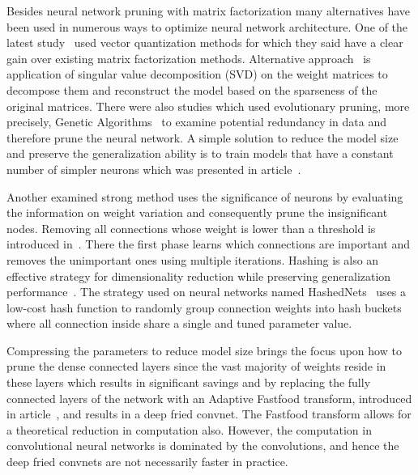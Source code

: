 \documentclass{article} %
\begin{document}
Besides neural network pruning with matrix factorization many alternatives have
been used in numerous ways to optimize neural network architecture. One of the
latest study~\cite{DBLP:journals/corr/GongLYB14} used vector quantization
methods for which they said have a clear gain over existing matrix
factorization methods. Alternative approach~\cite{xue2013restructuring} is
application of singular value decomposition (SVD) on the weight matrices to
decompose them and reconstruct the model based on the sparseness of the
original matrices. There were also studies which used evolutionary pruning,
more precisely, Genetic Algorithms~\cite{li2012tuning} to examine potential
redundancy in data and therefore prune the neural network. A simple solution to
reduce the model size and preserve the generalization ability is to train
models that have a constant number of simpler neurons which was presented in
article~\cite{collins2014memory}.

Another examined strong method uses the significance of neurons by evaluating
the information on weight variation and consequently prune the insignificant
nodes. Removing all connections whose weight is lower than a threshold is
introduced in~\cite{han2015learning}. There the first phase learns which
connections are important and removes the unimportant ones using multiple
iterations. Hashing is also an effective strategy for dimensionality reduction
while preserving generalization performance~\cite{weinberger2009feature,
shi2009hash}. The strategy used on neural networks named
HashedNets~\cite{chen2015compressing} uses a low-cost hash function to randomly
group connection weights into hash buckets where all connection inside share a
single and tuned parameter value.

Compressing the parameters to reduce model size brings the focus upon how to
prune the dense connected layers since the vast majority of weights reside in
these layers which results in significant savings and by replacing the fully
connected layers of the network with an Adaptive Fastfood transform, introduced
in article~\cite{yang2014deep}, and results in a deep fried convnet. The
Fastfood transform allows for a theoretical reduction in computation also.
However, the computation in convolutional neural networks is dominated by the
convolutions, and hence the deep fried convnets are not necessarily faster in
practice.

\end{document}
